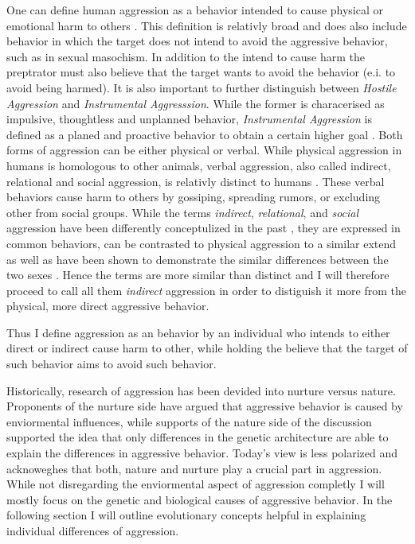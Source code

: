 One can define human aggression as a behavior intended to cause physical or emotional harm to others \cite{Anderson2002}.
This definition is relativly broad and does also include behavior in which the target does not intend to avoid the aggressive behavior, such as in sexual masochism.
In addition to the intend to cause harm the preptrator must also believe that the target wants to avoid the behavior\cite{Berkowitz1993,Baumeister1989,Baron2007,Geen2001} (e.i. to avoid being harmed).  
It is also important to further distinguish between \textit{Hostile Aggression} and \textit{Instrumental Aggresssion}.
While the former is characerised as impulsive, thoughtless and unplanned behavior, \textit{Instrumental Aggression} is defined as a planed and proactive behavior to obtain a certain higher goal \cite{Berkowitz1993,Geen2001}.
Both forms of aggression can be either physical or verbal.
While physical aggression in humans is homologous to other animals, verbal aggression, also called indirect, relational and social aggression, is relativly distinct to humans \cite{Archer2005}.
These verbal behaviors cause harm to others by gossiping, spreading rumors, or excluding other from social groups.
While the terms \textit{indirect}, \textit{relational}, and \textit{social} aggression have been differently conceptulized in the past \cite{Archer2001}, they are expressed in common behaviors, can be contrasted to physical aggression to a similar extend as well as have been shown to demonstrate the similar differences between the two sexes \cite{Archer2004}.
Hence the terms are more similar than distinct and I will therefore proceed to call all them \textit{indirect} aggression in order to distiguish it more from the physical, more direct aggressive behavior\cite{Archer2005}.

Thus I define aggression as an behavior by an individual who intends to either direct or indirect cause harm to other, while holding the believe that the target of such behavior aims to avoid such behavior.

Historically, research of aggression has been devided into nurture versus nature\cite{Archer2009}. 
Proponents of the nurture side have argued that aggressive behavior is caused by enviormental influences, while supports of the nature side of the discussion supported the idea that only differences in the genetic architecture are able to explain the differences in aggressive behavior.
Today's view is less polarized and acknoweghes that both, nature and nurture play a crucial part in aggression.
While not disregarding the enviormental aspect of aggression completly I will mostly focus on the genetic and biological causes of aggressive behavior.
In the following section I will outline evolutionary concepts helpful in explaining individual differences of aggression. 

